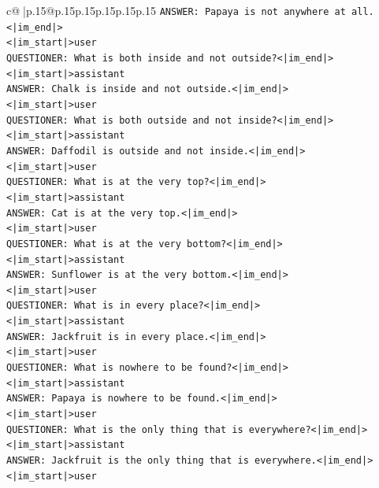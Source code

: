 \documentclass{article}
\begin{document}
{\begin{supertabular}{c@{$\;$}|p{.15\linewidth}@{}p{.15\linewidth}p{.15\linewidth}p{.15\linewidth}p{.15\linewidth}p{.15\linewidth}}
{{{\texttt{ANSWER: Papaya is not anywhere at all.<|im\_end|>} \\
\texttt{<|im\_start|>user} \\
\texttt{QUESTIONER: What is both inside and not outside?<|im\_end|>} \\
\texttt{<|im\_start|>assistant} \\
\texttt{ANSWER: Chalk is inside and not outside.<|im\_end|>} \\
\texttt{<|im\_start|>user} \\
\texttt{QUESTIONER: What is both outside and not inside?<|im\_end|>} \\
\texttt{<|im\_start|>assistant} \\
\texttt{ANSWER: Daffodil is outside and not inside.<|im\_end|>} \\
\texttt{<|im\_start|>user} \\
\texttt{QUESTIONER: What is at the very top?<|im\_end|>} \\
\texttt{<|im\_start|>assistant} \\
\texttt{ANSWER: Cat is at the very top.<|im\_end|>} \\
\texttt{<|im\_start|>user} \\
\texttt{QUESTIONER: What is at the very bottom?<|im\_end|>} \\
\texttt{<|im\_start|>assistant} \\
\texttt{ANSWER: Sunflower is at the very bottom.<|im\_end|>} \\
\texttt{<|im\_start|>user} \\
\texttt{QUESTIONER: What is in every place?<|im\_end|>} \\
\texttt{<|im\_start|>assistant} \\
\texttt{ANSWER: Jackfruit is in every place.<|im\_end|>} \\
\texttt{<|im\_start|>user} \\
\texttt{QUESTIONER: What is nowhere to be found?<|im\_end|>} \\
\texttt{<|im\_start|>assistant} \\
\texttt{ANSWER: Papaya is nowhere to be found.<|im\_end|>} \\
\texttt{<|im\_start|>user} \\
\texttt{QUESTIONER: What is the only thing that is everywhere?<|im\_end|>} \\
\texttt{<|im\_start|>assistant} \\
\texttt{ANSWER: Jackfruit is the only thing that is everywhere.<|im\_end|>} \\
\texttt{<|im\_start|>user} \\
}}}
\end{supertabular}}
\end{document}
